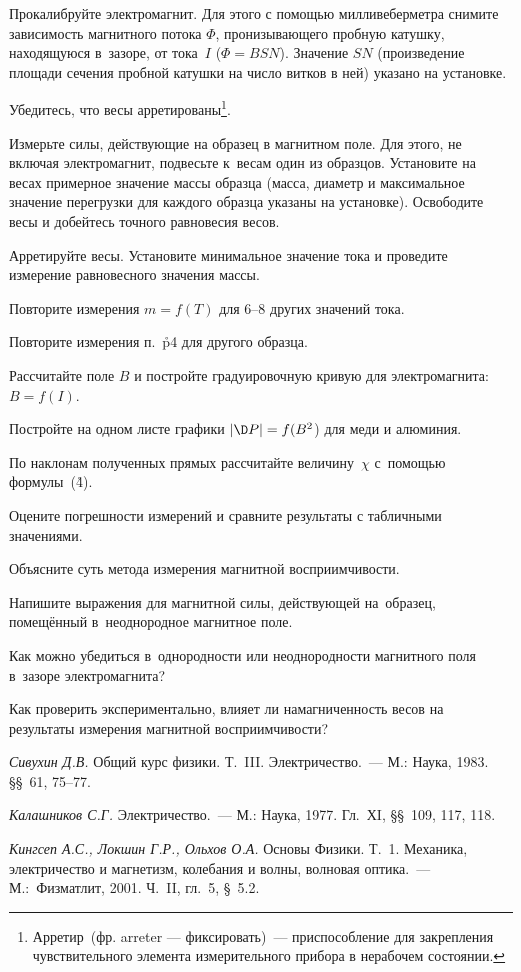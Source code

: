 \n Прокалибруйте электромагнит. Для этого с помощью милливеберметра снимите зависимость магнитного потока $\Phi$,
пронизывающего пробную катушку, находящуюся в~зазоре, от тока~$I$ ($\Phi=BSN$). Значение $SN$ (произведение площади
сечения пробной катушки на число витков в ней) указано на установке.


\n Убедитесь, что весы арретированы\footnote{Арретир~(фр. arreter --- фиксировать)~--- приспособление для закрепления
чувствительного элемента измерительного прибора в нерабочем состоянии.}.


\n[p4] Измерьте силы, действующие на образец в магнитном поле. Для этого, не включая электромагнит, подвесьте к~весам
один из образцов. Установите на весах примерное значение массы образца (масса, диаметр и максимальное значение
перегрузки для каждого образца указаны на установке). Освободите весы и добейтесь точного равновесия весов.

Арретируйте весы. Установите минимальное значение тока и проведите измерение равновесного значения массы.

Повторите измерения $m=f(T)$ для 6--8 других значений тока.

\n Повторите измерения п.~\r{p4} для другого образца.

\Obrab

\n Рассчитайте поле $B$ и постройте градуировочную кривую для электромагнита: $B=f(I)$.

\n Постройте на одном листе графики $|\D P|=f(B^2$) для меди и алюминия.

\n По наклонам полученных прямых рассчитайте величину~$\chi$ с~помощью формулы~(\r{4}).

\n Оцените погрешности измерений и сравните результаты с табличными значениями.

{\small

\kv

\n Объясните суть метода измерения магнитной восприимчивости.

\n Напишите выражения для магнитной силы, действующей на~образец, помещённый в~неоднородное магнитное поле.

\n Как можно убедиться в~однородности или неоднородности магнитного поля в~зазоре электромагнита?

\n Как проверить экспериментально, влияет ли намагниченность весов на результаты измерения магнитной восприимчивости?

\lit

\n \emph{Сивухин Д.В.} Общий курс физики. Т.~III. Электричество.~--- М.: Наука, 1983. \S\S~61, 75--77.

\n \emph {Калашников С.Г.} Электричество.~--- М.: Наука, 1977. Гл.~ХI, \S\S~109, 117, 118.

\n \emph{Кингсеп А.С., Локшин Г.Р., Ольхов О.А.} Основы Физики. Т.~1. Механика, электричество и магнетизм, колебания и
волны, волновая оптика.~--- М.:~Физматлит, 2001. Ч.~II, гл.~5, \S~5.2.

}
